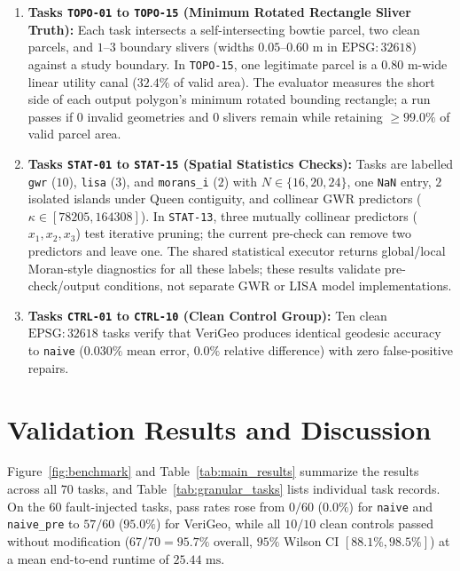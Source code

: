 \documentclass[10pt,twocolumn]{article}
\begin{document}
\begin{enumerate}
  \item \textbf{Tasks \texttt{TOPO-01} to \texttt{TOPO-15} (Minimum Rotated Rectangle Sliver Truth):} Each task intersects a self-intersecting bowtie parcel, two clean parcels, and $1\text{--}3$ boundary slivers (widths $0.05\text{--}0.60\text{ m}$ in $\text{EPSG}:32618$) against a study boundary. In \texttt{TOPO-15}, one legitimate parcel is a $0.80\text{ m}$-wide linear utility canal ($32.4\%$ of valid area). The evaluator measures the short side of each output polygon's minimum rotated bounding rectangle; a run passes if $0$ invalid geometries and $0$ slivers remain while retaining $\ge 99.0\%$ of valid parcel area.
  \item \textbf{Tasks \texttt{STAT-01} to \texttt{STAT-15} (Spatial Statistics Checks):} Tasks are labelled \texttt{gwr} ($10$), \texttt{lisa} ($3$), and \texttt{morans\_i} ($2$) with $N \in \{16, 20, 24\}$, one \texttt{NaN} entry, $2$ isolated islands under Queen contiguity, and collinear GWR predictors ($\kappa \in [78205, 164308]$). In \texttt{STAT-13}, three mutually collinear predictors ($x_1, x_2, x_3$) test iterative pruning; the current pre-check can remove two predictors and leave one. The shared statistical executor returns global/local Moran-style diagnostics for all these labels; these results validate pre-check/output conditions, not separate GWR or LISA model implementations.
  \item \textbf{Tasks \texttt{CTRL-01} to \texttt{CTRL-10} (Clean Control Group):} Ten clean $\text{EPSG}:32618$ tasks verify that VeriGeo produces identical geodesic accuracy to \texttt{naive} ($0.030\%$ mean error, $0.0\%$ relative difference) with zero false-positive repairs.
\end{enumerate}

\section{Validation Results and Discussion}

Figure~\ref{fig:benchmark} and Table~\ref{tab:main_results} summarize the results across all $70$ tasks, and Table~\ref{tab:granular_tasks} lists individual task records. On the $60$ fault-injected tasks, pass rates rose from $0/60$ ($0.0\%$) for \texttt{naive} and \texttt{naive\_pre} to $57/60$ ($95.0\%$) for VeriGeo, while all $10/10$ clean controls passed without modification ($67/70 = 95.7\%$ overall, $95\%$ Wilson CI $[88.1\%, 98.5\%]$) at a mean end-to-end runtime of $25.44\text{ ms}$.
\end{document}

